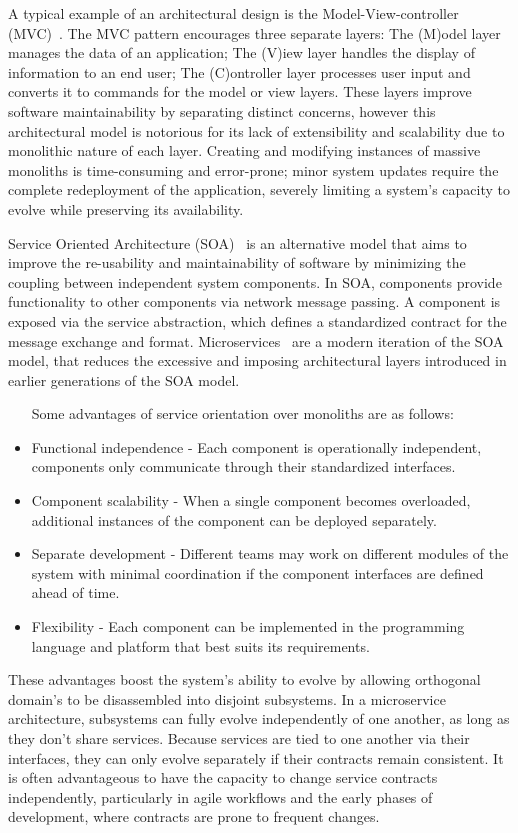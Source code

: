 A typical example of an architectural design is the Model-View-controller (MVC)~\cite{mvc, microservices}.
The MVC pattern encourages three separate layers: The (M)odel layer manages the data of an application;
The (V)iew layer handles the display of information to an end user; The (C)ontroller layer
processes user input and converts it to commands for the model or view layers.
These layers improve software maintainability by separating distinct concerns,
however this architectural model is notorious for its lack of extensibility and scalability due to monolithic nature of each layer.
Creating and modifying instances of massive monoliths is time-consuming and error-prone;
minor system updates require the complete redeployment of the application, severely limiting a system's capacity to evolve while preserving its availability.

Service Oriented Architecture (SOA)~\cite{7} is an alternative model that aims to
improve the re-usability and maintainability of software by minimizing the coupling between independent system components.
In SOA, components provide functionality to other components via network message passing.
A component is exposed via the service abstraction, which defines a standardized contract for the message exchange and format.
Microservices~\cite{microservices} are a modern iteration of the SOA model,
that reduces the excessive and imposing architectural layers introduced in earlier generations of the SOA model.
\begin{itemize}
    \setlength\itemsep{0em}
    \item [Some advantages of service orientation over monoliths are as follows:]
    \item Functional independence - Each component is operationally independent, components only communicate through their standardized interfaces.
    \item Component scalability - When a single component becomes overloaded, additional instances of the component can be deployed separately.
    \item Separate development - Different teams may work on different modules of the system with minimal coordination if the component interfaces are defined ahead of time.
    \item Flexibility - Each component can be implemented in the programming language and platform that best suits its requirements.
\end{itemize}

These advantages boost the system's ability to evolve by allowing orthogonal domain's to be disassembled into disjoint subsystems.
In a microservice architecture, subsystems can fully evolve independently of one another, as long as they don't share services.
Because services are tied to one another via their interfaces, they can only evolve separately if their contracts remain consistent.
It is often advantageous to have the capacity to change service contracts independently,
particularly in agile workflows and the early phases of development, where contracts are prone to frequent changes.

